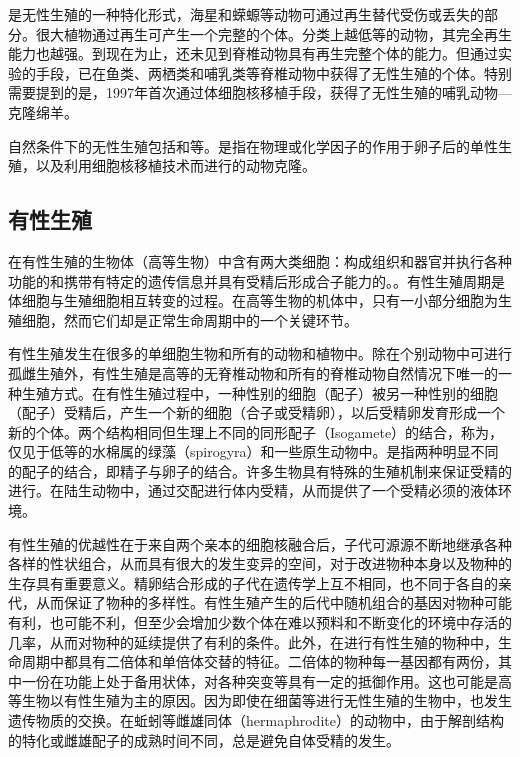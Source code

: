 是无性生殖的一种特化形式，海星和蝾螈等动物可通过再生替代受伤或丢失的部分。很大植物通过再生可产生一个完整的个体。分类上越低等的动物，其完全再生能力也越强。到现在为止，还未见到脊椎动物具有再生完整个体的能力。但通过实验的手段，已在鱼类、两栖类和哺乳类等脊椎动物中获得了无性生殖的个体。特别需要提到的是，1997年首次通过体细胞核移植手段，获得了无性生殖的哺乳动物---克隆绵羊。

自然条件下的无性生殖包括和等。是指在物理或化学因子的作用于卵子后的单性生殖，以及利用细胞核移植技术而进行的动物克隆。

\subsection{有性生殖}

在有性生殖的生物体（高等生物）中含有两大类细胞：构成组织和器官并执行各种功能的和携带有特定的遗传信息并具有受精后形成合子能力的。。有性生殖周期是体细胞与生殖细胞相互转变的过程。在高等生物的机体中，只有一小部分细胞为生殖细胞，然而它们却是正常生命周期中的一个关键环节。

有性生殖发生在很多的单细胞生物和所有的动物和植物中。除在个别动物中可进行孤雌生殖外，有性生殖是高等的无脊椎动物和所有的脊椎动物自然情况下唯一的一种生殖方式。在有性生殖过程中，一种性别的细胞（配子）被另一种性别的细胞（配子）受精后，产生一个新的细胞（合子或受精卵），以后受精卵发育形成一个新的个体。两个结构相同但生理上不同的同形配子（Isogamete）的结合，称为，仅见于低等的水棉属的绿藻（spirogyra）和一些原生动物中。是指两种明显不同的配子的结合，即精子与卵子的结合。许多生物具有特殊的生殖机制来保证受精的进行。在陆生动物中，通过交配进行体内受精，从而提供了一个受精必须的液体环境。

有性生殖的优越性在于来自两个亲本的细胞核融合后，子代可源源不断地继承各种各样的性状组合，从而具有很大的发生变异的空间，对于改进物种本身以及物种的生存具有重要意义。精卵结合形成的子代在遗传学上互不相同，也不同于各自的亲代，从而保证了物种的多样性。有性生殖产生的后代中随机组合的基因对物种可能有利，也可能不利，但至少会增加少数个体在难以预料和不断变化的环境中存活的几率，从而对物种的延续提供了有利的条件。此外，在进行有性生殖的物种中，生命周期中都具有二倍体和单倍体交替的特征。二倍体的物种每一基因都有两份，其中一份在功能上处于备用状体，对各种突变等具有一定的抵御作用。这也可能是高等生物以有性生殖为主的原因。因为即使在细菌等进行无性生殖的生物中，也发生遗传物质的交换。在蚯蚓等雌雄同体（hermaphrodite）的动物中，由于解剖结构的特化或雌雄配子的成熟时间不同，总是避免自体受精的发生。

